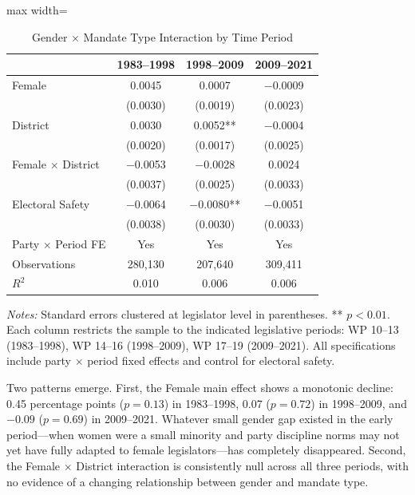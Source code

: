 \documentclass[12pt]{article}
\begin{document}
\begin{table}[htbp]
\centering
\caption{Gender $\times$ Mandate Type Interaction by Time Period}
\label{tab:time}
\begin{adjustbox}{max width=\textwidth}
\begin{tabular}{lccc}
\toprule
& 1983--1998 & 1998--2009 & 2009--2021 \\
\midrule
Female & 0.0045 & 0.0007 & $-$0.0009 \\
& (0.0030) & (0.0019) & (0.0023) \\
District & 0.0030 & 0.0052** & $-$0.0004 \\
& (0.0020) & (0.0017) & (0.0025) \\
Female $\times$ District & $-$0.0053 & $-$0.0028 & 0.0024 \\
& (0.0037) & (0.0025) & (0.0033) \\
Electoral Safety & $-$0.0064 & $-$0.0080** & $-$0.0051 \\
& (0.0038) & (0.0030) & (0.0033) \\
\midrule
Party $\times$ Period FE & Yes & Yes & Yes \\
Observations & 280,130 & 207,640 & 309,411 \\
$R^2$ & 0.010 & 0.006 & 0.006 \\
\bottomrule
\end{tabular}
\end{adjustbox}
\begin{minipage}{0.95\textwidth}
\vspace{0.5em}
\footnotesize
\textit{Notes:} Standard errors clustered at legislator level in parentheses. ** $p<0.01$. Each column restricts the sample to the indicated legislative periods: WP 10--13 (1983--1998), WP 14--16 (1998--2009), WP 17--19 (2009--2021). All specifications include party $\times$ period fixed effects and control for electoral safety.
\end{minipage}
\end{table}

Two patterns emerge. First, the Female main effect shows a monotonic decline: 0.45 percentage points ($p = 0.13$) in 1983--1998, 0.07 ($p = 0.72$) in 1998--2009, and $-0.09$ ($p = 0.69$) in 2009--2021. Whatever small gender gap existed in the early period---when women were a small minority and party discipline norms may not yet have fully adapted to female legislators---has completely disappeared. Second, the Female $\times$ District interaction is consistently null across all three periods, with no evidence of a changing relationship between gender and mandate type.
\end{document}
